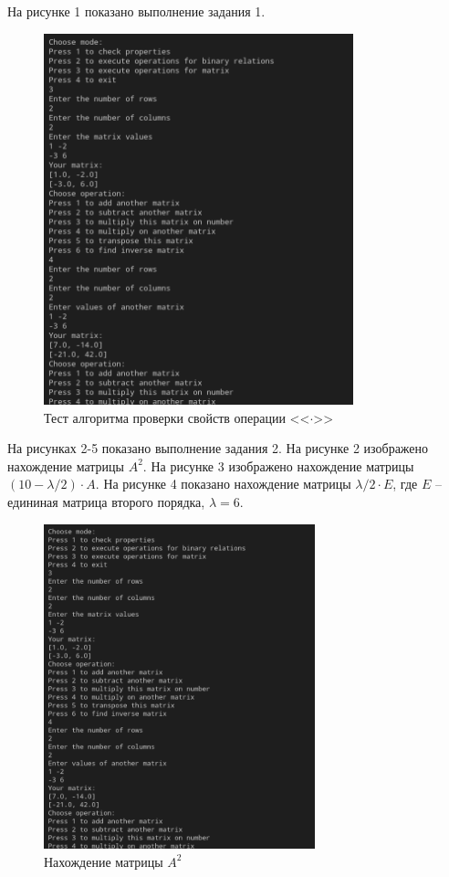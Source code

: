 \documentclass[bachelor, och, labwork]{shiza}
\begin{document}
        На рисунке 1 показано выполнение задания 1.
        \begin{figure}[H]
            \centering
            \includegraphics[width=0.8\textwidth]{photo/2.png}
            \caption{Тест алгоритма проверки свойств операции <<$\cdot$>>}
        \end{figure}

        На рисунках 2-5 показано выполнение задания 2.
        На рисунке 2 изображено нахождение матрицы $A^2$. На рисунке 3 изображено нахождение матрицы $(10 - \lambda / 2) \cdot A$.
        На рисунке 4 показано нахождение матрицы $\lambda / 2\cdot E$, где $E$ -- едининая матрица второго порядка, $\lambda = 6$.
        \begin{figure}[H]
            \centering
            \includegraphics[width=0.7\textwidth]{photo/2.png}
            \caption{Нахождение матрицы $A^2$}
        \end{figure}
\end{document}
